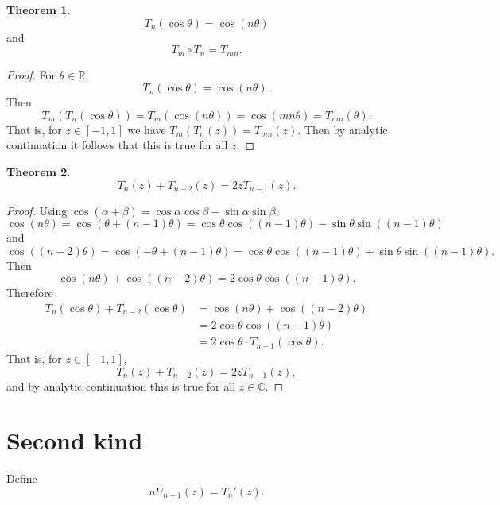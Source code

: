 \documentclass{article}
\theoremstyle{definition}
\newtheorem{theorem}{Theorem}
\theoremstyle{definition}
\begin{document}
\begin{theorem}
\[
T_n(\cos \theta) = \cos(n\theta)
\]
and
\[
T_m \circ T_n = T_{mn}.
\]
\label{Tncos}
\end{theorem}
\begin{proof}
For $\theta \in \mathbb{R}$,
\[
T_n(\cos \theta) = \cos(n\theta).
\]
Then
\[
T_m(T_n(\cos \theta)) = T_m( \cos (n\theta))
=\cos (mn\theta)
=T_{mn}(\theta).
\]
That is, for $z \in [-1,1]$ we have
$T_m(T_n(z)) = T_{mn}(z)$. Then by analytic continuation it follows that
this is true for all $z$.
\end{proof}

\begin{theorem}
\[
T_n(z)+T_{n-2}(z)=2zT_{n-1}(z).
\]
\end{theorem}
\begin{proof}
Using $\cos(\alpha+\beta)=\cos \alpha \cos \beta - \sin \alpha \sin \beta$, 
\[
\cos(n\theta) = \cos(\theta+(n-1)\theta)
=\cos \theta \cos((n-1)\theta)-\sin\theta\sin((n-1)\theta)
\]
and
\[
\cos((n-2)\theta) = \cos(-\theta+(n-1)\theta)
=\cos \theta \cos((n-1)\theta)+\sin\theta\sin((n-1)\theta).
\]
Then
\[
\cos(n\theta)+\cos((n-2)\theta)=2 \cos \theta \cos((n-1)\theta).
\]
Therefore
\begin{align*}
T_n(\cos \theta)+T_{n-2}(\cos\theta)&=\cos(n\theta)
+\cos((n-2)\theta)\\
&=2 \cos \theta \cos((n-1)\theta)\\
&=2 \cos \theta \cdot T_{n-1}(\cos\theta).
\end{align*}
That is, for $z \in [-1,1]$,
\[
T_n(z)+T_{n-2}(z)=2zT_{n-1}(z),
\]
and by analytic continuation this is true for all $z \in \mathbb{C}$.
\end{proof}



\section{Second kind}
Define
\begin{equation}
nU_{n-1}(z) = T_n'(z).
\label{Un}
\end{equation}
\end{document}
